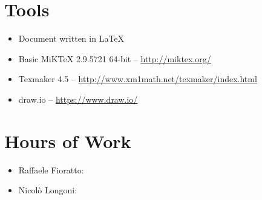 \newpage
\begin{appendices}
\section{Tools}
\begin{itemize}
	\item Document written in \LaTeX
	\item Basic MiKTeX 2.9.5721 64-bit -- \url{http://miktex.org/}
	\item Texmaker 4.5 -- \url{http://www.xm1math.net/texmaker/index.html}
	\item draw.io -- \url{https://www.draw.io/}
\end{itemize}
\break
\section{Hours of Work}
\begin{itemize}
	\item Raffaele Fioratto: 
	\item Nicol\`{o} Longoni: 
\end{itemize}
\end{appendices}